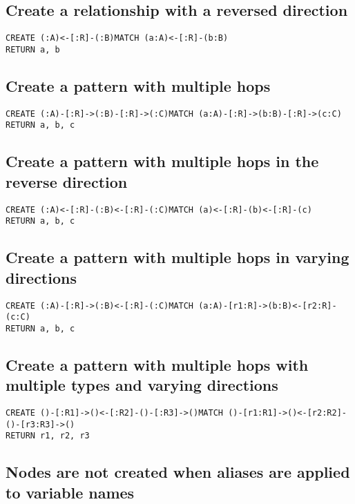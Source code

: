 \subsection{Create a relationship with a reversed direction}

\begin{lstlisting}
CREATE (:A)<-[:R]-(:B)MATCH (a:A)<-[:R]-(b:B)
RETURN a, b
\end{lstlisting}

\subsection{Create a pattern with multiple hops}

\begin{lstlisting}
CREATE (:A)-[:R]->(:B)-[:R]->(:C)MATCH (a:A)-[:R]->(b:B)-[:R]->(c:C)
RETURN a, b, c
\end{lstlisting}

\subsection{Create a pattern with multiple hops in the reverse direction}

\begin{lstlisting}
CREATE (:A)<-[:R]-(:B)<-[:R]-(:C)MATCH (a)<-[:R]-(b)<-[:R]-(c)
RETURN a, b, c
\end{lstlisting}

\subsection{Create a pattern with multiple hops in varying directions}

\begin{lstlisting}
CREATE (:A)-[:R]->(:B)<-[:R]-(:C)MATCH (a:A)-[r1:R]->(b:B)<-[r2:R]-(c:C)
RETURN a, b, c
\end{lstlisting}

\subsection{Create a pattern with multiple hops with multiple types and varying directions}

\begin{lstlisting}
CREATE ()-[:R1]->()<-[:R2]-()-[:R3]->()MATCH ()-[r1:R1]->()<-[r2:R2]-()-[r3:R3]->()
RETURN r1, r2, r3
\end{lstlisting}

\subsection{Nodes are not created when aliases are applied to variable names}

